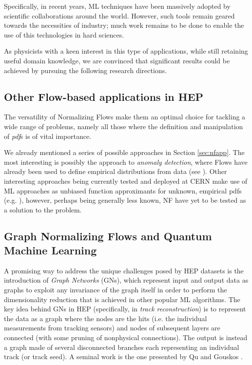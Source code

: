 Specifically, in recent years, ML techniques have been massively adopted by scientific collaborations around the world. However, such tools remain geared towards the necessities of industry; much work remains to be done to enable the use of this technologies in hard sciences.

As physicists with a keen interest in this type of applications, while still retaining useful domain knowledge, we are convinced that significant results could be achieved by pursuing the following research directions. 

\subsection{Other Flow-based applications in HEP}

The versatility of Normalizing Flows make them an optimal choice for tackling a wide range of problems, namely all those where the definition and manipulation of \emph{pdf}s is of vital importance.

We already mentioned a series of possible approaches in Section \ref{sec:nfapp}. The most interesting is possibly the approach to \emph{anomaly detection}, where Flows have already been used to define empirical distributions from data (see \cite{Kasieczka_2021}). Other interesting approaches being currently tested and deployed at CERN make use of ML approaches as unbiased function approximants for unknown, empirical pdfs (e.g. \cite{D_Agnolo_2019}), however, perhaps being generally less known, NF have yet to be tested as a solution to the problem.

\subsection{Graph Normalizing Flows and Quantum Machine Learning}

A promising way to address the unique challenges posed by HEP datasets is the introduction of \emph{Graph Networks} (GNs), which represent input and output data as graphs to exploit any invariance of the graph itself in order to perform the dimensionality reduction that is achieved in other popular ML algorithms. 
The key idea behind GNs in HEP (specifically, in \emph{track reconstruction}) is to represent the data as a graph where the nodes are the hits (i.e. the individual measurements from tracking sensors) and nodes of subsequent layers are connected (with some pruning of nonphysical connections). The output is instead a graph made of several disconnected branches each representing an
individual track (or track seed). A seminal work is the one presented by Qu and Gouskos \cite{pj2020}.



